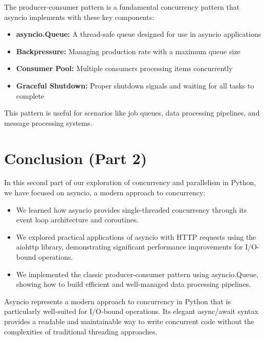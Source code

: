 \documentclass[12pt,letterpaper]{article}
\begin{document}
The producer-consumer pattern is a fundamental concurrency pattern that asyncio implements with these key components:

\begin{itemize}
    \item \textbf{\textcolor{pythonBlue}{asyncio.Queue:}} A thread-safe queue designed for use in asyncio applications
    \item \textbf{\textcolor{pythonBlue}{Backpressure:}} Managing production rate with a maximum queue size
    \item \textbf{\textcolor{pythonBlue}{Consumer Pool:}} Multiple consumers processing items concurrently
    \item \textbf{\textcolor{pythonBlue}{Graceful Shutdown:}} Proper shutdown signals and waiting for all tasks to complete
\end{itemize}

This pattern is useful for scenarios like job queues, data processing pipelines, and message processing systems.

\section{Conclusion (Part 2)}

In this second part of our exploration of concurrency and parallelism in Python, we have focused on asyncio, a modern approach to concurrency:

\begin{itemize}
    \item We learned how asyncio provides single-threaded concurrency through its event loop architecture and coroutines.
    
    \item We explored practical applications of asyncio with HTTP requests using the aiohttp library, demonstrating significant performance improvements for I/O-bound operations.
    
    \item We implemented the classic producer-consumer pattern using asyncio.Queue, showing how to build efficient and well-managed data processing pipelines.
\end{itemize}

Asyncio represents a modern approach to concurrency in Python that is particularly well-suited for I/O-bound operations. Its elegant async/await syntax provides a readable and maintainable way to write concurrent code without the complexities of traditional threading approaches.
\end{document}
